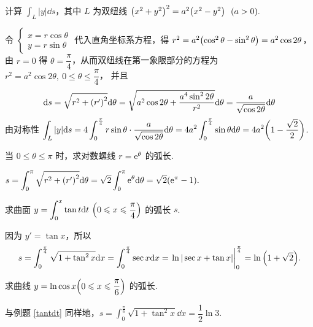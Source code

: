 \begin{example}
    计算 $\displaystyle \int_{L}|y|\dd s$，其中 $L$ 为双纽线 $\qty(x^2+y^2)^2=a^2\qty(x^2-y^2)~~(a>0).$
\end{example}
\begin{solution}
    令 $\begin{cases}
            x=r\cos\theta \\
            y=r\sin\theta
        \end{cases}$ 代入直角坐标系方程，得 $r^2=a^2\qty(\cos^2\theta-\sin^2\theta)=a^2\cos 2\theta$，由 $r=0$ 得 $\theta=\dfrac{\pi}{4}$，从而双纽线在第一象限部分的方程为 $r^2=a^2\cos2\theta,~0\leqslant\theta\leqslant \dfrac{\pi}{4}$，
    并且 $$\dd s=\sqrt{r^2+\qty(r')^2}\dd \theta=\sqrt{a^2\cos2\theta+\dfrac{a^4\sin ^22\theta}{r^2}}\dd \theta=\dfrac{a}{\sqrt{\cos 2\theta}}\dd \theta$$
    由对称性 $\displaystyle \int_{L}|y|\dd s=4\int_{0}^{\frac{\pi}{4}}r\sin\theta\cdot\dfrac{a}{\sqrt{\cos 2\theta}}\dd \theta=4a^2\int_{0}^{\frac{\pi}{4}}\sin\theta\dd \theta=4a^2\qty(1-\dfrac{\sqrt{2}}{2})$.
\end{solution}

\begin{example}[2010 数二]
    当 $0\leqslant\theta\leqslant \pi$ 时，求对数螺线 $r=\mathrm{e}^{\theta}$ 的弧长.
\end{example}
\begin{solution}
    $\displaystyle s=\int_{0}^{\pi}\sqrt{r^2+\qty(r')^2}\dd \theta=\sqrt{2}\int_{0}^{\pi}\mathrm{e}^\theta\dd \theta=\sqrt{2}\qty(\mathrm{e}^{\pi}-1).$
\end{solution}

\begin{example}[2011 数一]
    求曲面\label{tantdt} $\displaystyle y=\int_{0}^{x}\tan t\dd t~ \qty(0\leqslant x\leqslant \dfrac{\pi}{4})$ 的弧长 $s$.
\end{example}
\begin{solution}
    因为 $y'=\tan x$，所以
    $$s=\int_{0}^{\frac{\pi}{4}}\sqrt{1+\tan^2x}\dd x=\int_{0}^{\frac{\pi}{4}}\sec x\dd x=\eval{\ln|\sec x+\tan x|}_{0}^{\frac{\pi}{4}}=\ln\qty(1+\sqrt{2}).$$
\end{solution}

\begin{example}[2019 数二]
    求曲线 $y=\ln\cos x\qty(0\leqslant x\leqslant \dfrac{\pi}{6})$ 的弧长.
\end{example}
\begin{solution}
    与例题 \ref{tantdt} 同样地，$\displaystyle s=\int_{0}^{\frac{\pi}{6}}\sqrt{1+\tan^2x}\dd x=\dfrac{1}{2}\ln 3.$
\end{solution}

